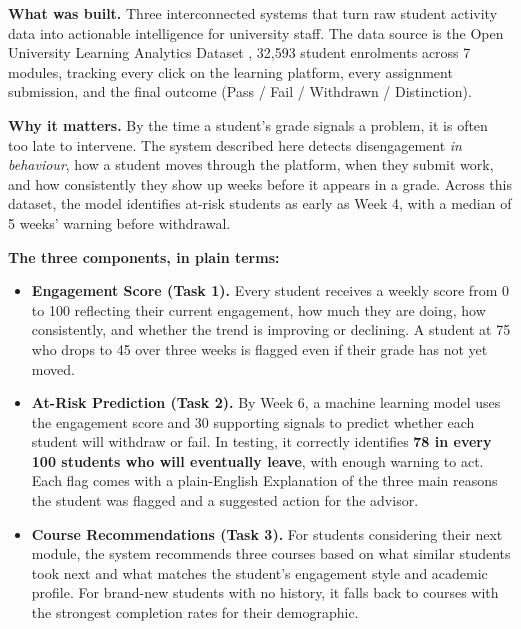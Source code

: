 \documentclass[10pt,a4paper]{article}
\begin{document}
\begin{execbox}
\textbf{What was built.} Three interconnected systems that turn raw student activity data into
actionable intelligence for university staff. The data source is the Open University Learning
Analytics Dataset , 32,593 student enrolments across 7 modules, tracking every click on the
learning platform, every assignment submission, and the final outcome (Pass / Fail /
Withdrawn / Distinction).

\medskip
\textbf{Why it matters.} By the time a student's grade signals a problem, it is often too late to
intervene. The system described here detects disengagement \emph{in behaviour}, how a student
moves through the platform, when they submit work, and how consistently they show up weeks
before it appears in a grade. Across this dataset, the model identifies at-risk students
as early as Week 4, with a median of 5 weeks' warning before withdrawal.

\medskip
\textbf{The three components, in plain terms:}

\begin{itemize}
  \item \textbf{Engagement Score (Task 1).} Every student receives a weekly score from 0 to 100
    reflecting their current engagement, how much they are doing, how consistently, and
    whether the trend is improving or declining. A student at 75 who drops to 45 over three
    weeks is flagged even if their grade has not yet moved.

  \item \textbf{At-Risk Prediction (Task 2).} By Week 6, a machine learning model uses the
    engagement score and 30 supporting signals to predict whether each student will withdraw
    or fail. In testing, it correctly identifies \textbf{78 in every 100 students who will
    eventually leave}, with enough warning to act. Each flag comes with a plain-English
    Explanation of the three main reasons the student was flagged and a suggested action for
    the advisor.

  \item \textbf{Course Recommendations (Task 3).} For students considering their next module,
    the system recommends three courses based on what similar students took next and what
    matches the student's engagement style and academic profile. For brand-new students with
    no history, it falls back to courses with the strongest completion rates for their
    demographic.
\end{itemize}


\end{execbox}
\end{document}
